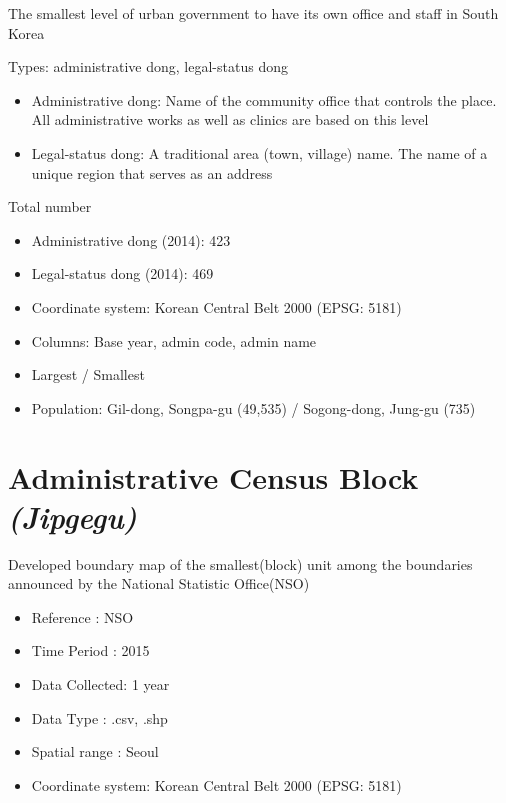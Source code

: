 \documentclass[]{book}
\providecommand{\tightlist}{%
  \setlength{\itemsep}{0pt}\setlength{\parskip}{0pt}}
\theoremstyle{definition}
\theoremstyle{definition}
\theoremstyle{definition}
\theoremstyle{remark}
\begin{document}
The smallest level of urban government to have its own office and staff
in South Korea

Types: administrative dong, legal-status dong

\begin{itemize}
\tightlist
\item
  Administrative dong: Name of the community office that controls the
  place. All administrative works as well as clinics are based on this
  level
\item
  Legal-status dong: A traditional area (town, village) name. The name
  of a unique region that serves as an address
\end{itemize}

Total number

\begin{itemize}
\tightlist
\item
  Administrative dong (2014): 423
\item
  Legal-status dong (2014): 469
\item
  Coordinate system: Korean Central Belt 2000 (EPSG: 5181)
\item
  Columns: Base year, admin code, admin name
\item
  Largest / Smallest
\item
  Population: Gil-dong, Songpa-gu (49,535) / Sogong-dong, Jung-gu (735)
\end{itemize}

\section{\texorpdfstring{Administrative Census Block
\emph{(Jipgegu)}}{Administrative Census Block (Jipgegu)}}\label{administrative-census-block-jipgegu}

Developed boundary map of the smallest(block) unit among the boundaries
announced by the National Statistic Office(NSO)

\begin{itemize}
\tightlist
\item
  Reference : NSO
\item
  Time Period : 2015
\item
  Data Collected: 1 year
\item
  Data Type : .csv, .shp
\item
  Spatial range : Seoul
\item
  Coordinate system: Korean Central Belt 2000 (EPSG: 5181)
\end{itemize}
\end{document}
